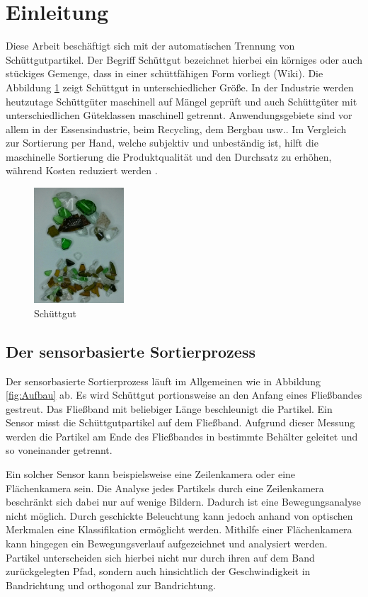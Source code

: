 \section{Einleitung}
Diese Arbeit beschäftigt sich mit der automatischen Trennung von Schüttgutpartikel. Der Begriff Schüttgut bezeichnet hierbei ein körniges oder auch stückiges Gemenge, dass in einer schüttfähigen Form vorliegt (Wiki). Die Abbildung \ref{fig:Schuettgut} zeigt Schüttgut in unterschiedlicher Größe. In der Industrie werden heutzutage Schüttgüter maschinell auf Mängel geprüft und auch Schüttgüter mit unterschiedlichen Güteklassen maschinell getrennt. Anwendungsgebiete sind vor allem in der Essensindustrie, beim Recycling, dem Bergbau usw.. Im Vergleich zur Sortierung per Hand, welche subjektiv und unbeständig ist, hilft die maschinelle Sortierung die Produktqualität und den Durchsatz zu erhöhen, während Kosten reduziert werden \cite{FoodQuality}. 

\begin{figure}[!h]
    \centering
    \includegraphics[width=0.3\textwidth]{pics/Schuettgut.png}
    \caption{Schüttgut}
    \label{fig:Schuettgut}
\end{figure}

\subsection{Der sensorbasierte Sortierprozess}
Der sensorbasierte Sortierprozess läuft im Allgemeinen wie in Abbildung \ref{fig:Aufbau} ab. Es wird Schüttgut portionsweise an den Anfang eines Fließbandes gestreut. Das Fließband mit beliebiger Länge beschleunigt die Partikel. Ein Sensor misst die Schüttgutpartikel auf dem Fließband. Aufgrund dieser Messung werden die Partikel am Ende des Fließbandes in bestimmte Behälter geleitet und so voneinander getrennt. 

Ein solcher Sensor kann beispielsweise eine Zeilenkamera oder eine Flächenkamera sein. Die Analyse jedes Partikels durch eine Zeilenkamera beschränkt sich dabei nur auf wenige Bildern. Dadurch ist eine Bewegungsanalyse nicht möglich. Durch geschickte Beleuchtung kann jedoch anhand von optischen Merkmalen eine Klassifikation ermöglicht werden. Mithilfe einer Flächenkamera kann hingegen ein Bewegungsverlauf aufgezeichnet und analysiert werden. Partikel unterscheiden sich hierbei nicht nur durch ihren auf dem Band zurückgelegten Pfad, sondern auch hinsichtlich der Geschwindigkeit in Bandrichtung und orthogonal zur Bandrichtung.

